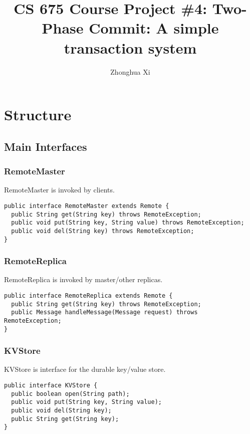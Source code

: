 \documentclass[11pt, oneside]{article}   	%
\title{CS 675 Course Project \#4: Two-Phase Commit: A simple transaction system}
\author{Zhonghua Xi}
\begin{document}
\maketitle

\section{Structure}
\subsection{Main Interfaces}
\subsubsection{RemoteMaster}
RemoteMaster is invoked by clients.

\begin{verbatim}
public interface RemoteMaster extends Remote {
  public String get(String key) throws RemoteException;
  public void put(String key, String value) throws RemoteException;
  public void del(String key) throws RemoteException;
}
\end{verbatim}

\subsubsection{RemoteReplica}
RemoteReplica is invoked by master/other replicas.
\begin{verbatim}
public interface RemoteReplica extends Remote {
  public String get(String key) throws RemoteException;
  public Message handleMessage(Message request) throws RemoteException;
}
\end{verbatim}

\subsubsection{KVStore}
KVStore is interface for the durable key/value store.
\begin{verbatim}
public interface KVStore {  
  public boolean open(String path);
  public void put(String key, String value);
  public void del(String key);
  public String get(String key);
}
\end{verbatim}
\end{document}
